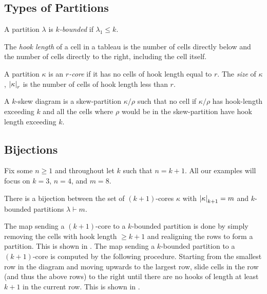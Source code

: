 \documentclass[letterpaper]{article}
\begin{document}
\subsection{Types of Partitions}

\begin{defn}
  A partition $\lambda$ is \emph{$k$-bounded} if $\lambda_1 \leq k$.
  
  The \emph{hook length} of a cell in a tableau is the number of cells directly below and the number of cells directly to the right, including the cell itself.

  A partition $\kappa$ is an \emph{$r$-core} if it has no cells of hook length equal to $r$.
  The \emph{size} of $\kappa$, $\abs{\kappa}_{r}$ is the number of cells of hook length less than $r$.

  A $k$-skew diagram is a skew-partition $\kappa / \rho$ such that no cell if $\kappa / \rho$ has hook-length exceeding $k$ and all the cells where $\rho$ would be in the skew-partition have hook length exceeding $k$.
\end{defn}

\clearpage

\subsection{Bijections}

Fix some $n \geq 1$ and throughout let $k$ such that $n = k + 1$.
All our examples will focus on $k = 3$, $n = 4$, and $m = 8$.

\begin{prop}\label{prop:core_bounded_bij}
  There is a bijection between the set of $(k + 1)$-cores $\kappa$ with $\abs{\kappa}_{k + 1} = m$ and $k$-bounded partitions $\lambda \vdash m$.
\end{prop}

The map sending a $(k + 1)$-core to a $k$-bounded partition is done by simply removing the cells with hook length $\geq k + 1$ and realigning the rows to form a partition.
This is shown in .
The map sending a $k$-bounded partition to a $(k + 1)$-core is computed by the following procedure.
Starting from the smallest row in the diagram and moving upwards to the largest row, slide cells in the row (and thus the above rows) to the right until there are no hooks of length at least $k + 1$ in the current row.
This is shown in .
\end{document}
